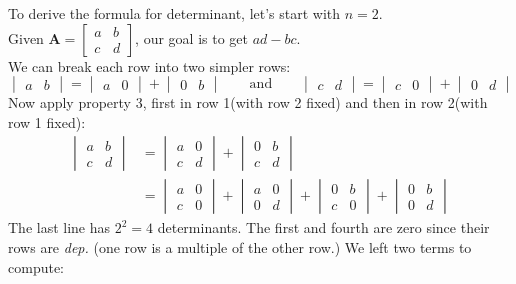 \begin{example}
To derive the formula for determinant, let's start with $n=2$.\\ Given $\bm A=\begin{bmatrix}
a&b\\c&d
\end{bmatrix}$, our goal is to get $ad-bc$.\\
We can break each row into two simpler rows:
\[
\begin{vmatrix}
a&b
\end{vmatrix}=\begin{vmatrix}
a&0
\end{vmatrix}+\begin{vmatrix}
0&b
\end{vmatrix}\qquad\text{and}\qquad
\begin{vmatrix}
c&d
\end{vmatrix}=\begin{vmatrix}
c&0
\end{vmatrix}+\begin{vmatrix}
0&d
\end{vmatrix}
\]
Now apply property 3, first in row 1(with row 2 fixed) and then in row 2(with row 1 fixed):
\[
\begin{aligned}
\begin{vmatrix}
a&b\\c&d
\end{vmatrix}&=\begin{vmatrix}
a&0\\c&d
\end{vmatrix}+\begin{vmatrix}
0&b\\c&d
\end{vmatrix}\\&=\begin{vmatrix}
a&0\\c&0
\end{vmatrix}+\begin{vmatrix}
a&0\\0&d
\end{vmatrix}+\begin{vmatrix}
0&b\\c&0
\end{vmatrix}+\begin{vmatrix}
0&b\\0&d
\end{vmatrix}
\end{aligned}
\]
The last line has $2^2=4$ determinants. The first and fourth are zero since their rows are \emph{dep.} (one row is a multiple of the other row.) We left two terms to compute:

\end{example}

